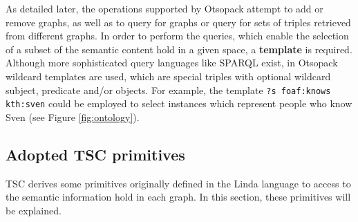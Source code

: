 As detailed later, the operations supported by Otsopack attempt to add or remove graphs, as well as to query for graphs or query for sets of triples retrieved from different graphs.
In order to perform the queries, which enable the selection of a subset of the semantic content hold in a given space, a \textbf{template} is required.
Although more sophisticated query languages like SPARQL exist, in Otsopack wildcard templates are used, which are special triples with optional wildcard subject, predicate and/or objects.
For example, the template \texttt{?s foaf:knows kth:sven} could be employed to select instances which represent people who know Sven (see Figure \ref{fig:ontology}).




\subsection{Adopted TSC primitives}
\label{sec:primitives}

TSC derives some primitives originally defined in the Linda language \citep{gelernter_generative_1985} to access to the semantic information hold in each graph.
In this section, these primitives will be explained.

